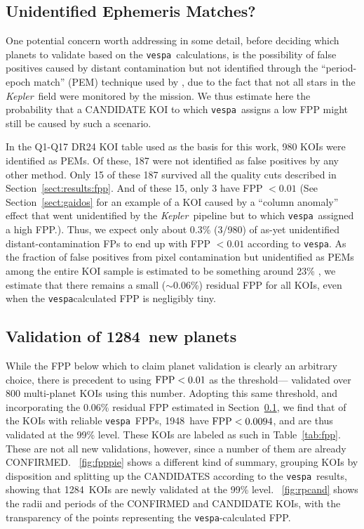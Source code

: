 \documentclass{emulateapj}
\newcommand{\figref}[1]{\ref{fig:#1}}
\newcommand{\Fig}[1]{\figurename~\figref{#1}}
\newcommand{\Tab}[1]{Table~\ref{tab:#1}}
\newcommand{\tab}[1]{\Tab{#1}}
\newcommand{\sectionname}{Section}
\newcommand{\Sect}[1]{\sectionname~\ref{sect:#1}}
\newcommand{\sect}[1]{\Sect{#1}}
\newcommand{\sectlabel}[1]{\label{sect:#1}}
\newcommand{\nval}{1948} %
\newcommand{\nvalnew}{1284} %
\newcommand{\kepler}{\textit{Kepler}}
\newcommand{\vespa}{\texttt{vespa}}
\begin{document}
\subsection{Unidentified Ephemeris Matches?}
\sectlabel{PEMs}

One potential concern worth addressing in some detail, before deciding
which planets to validate based on the \vespa\ calculations, is the 
possibility of false positives caused by distant contamination
but not identified through the ``period-epoch match'' (PEM) technique
used by \citet{Coughlin:2014}, due to the fact that not all stars in the 
\kepler\ field were monitored by the mission.  We thus estimate here
the probability that a CANDIDATE KOI to which \vespa\ assigns a low FPP
might still be caused by such a scenario.

In the Q1-Q17 DR24 KOI table used as the basis for this work, 980
KOIs were identified as PEMs.  Of these, 187 were not identified 
as false positives by any other method.  Only 15 of these 187 survived 
all the quality cuts described in \sect{results:fpp}. And of these 15, 
only 3 have FPP $< 0.01$  (See \sect{gaidos} for an example of a KOI caused by a 
``column anomaly'' effect that went unidentified by the \kepler\ pipeline but
to which \vespa\ assigned a high FPP.).  Thus, we expect only about 0.3\% (3/980) of 
as-yet unidentified distant-contamination FPs to end
up with FPP $< 0.01$ according to \vespa. As the fraction of false positives
from pixel contamination but unidentified as PEMs among the entire KOI sample is
estimated to be something around 23\% \citep{Coughlin:2014}, we estimate
that there remains a small ($\sim$0.06\%) residual FPP for all KOIs, even 
when the \vespa\-calculated FPP is negligibly tiny.

\subsection{Validation of \nvalnew\ new planets}

While the FPP below which to claim planet validation is clearly
an arbitrary choice, there is precedent to using ${\rm FPP} <0.01$ as 
the threshold---\citet{Rowe:2014} validated over 800 multi-planet KOIs
using this number.  Adopting this same threshold, and incorporating
the 0.06\% residual FPP estimated in \sect{PEMs}, we find that 
of the KOIs with reliable \vespa\ FPPs, \nval\ have ${\rm FPP}
<0.0094$, and are thus validated at the 99\% level.  
These KOIs are labeled as such in \tab{fpp}.  These are not all new validations,
however, since a number of them are already CONFIRMED. \Fig{fpppie}
shows a different kind of summary, grouping KOIs by disposition and
splitting up the CANDIDATES according to the \vespa\ results, showing
that \nvalnew\ KOIs are newly validated at the 99\% level.
\Fig{rpcand} shows the radii and periods of the CONFIRMED and 
CANDIDATE KOIs, with the transparency of the points representing
the \vespa-calculated FPP. 
\end{document}
